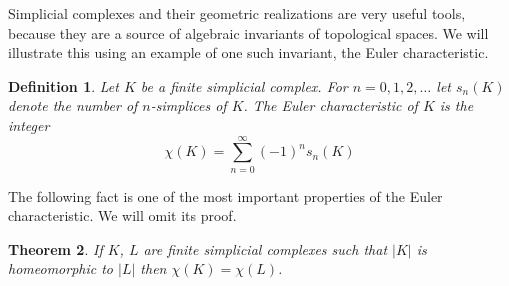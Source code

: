 \documentclass[11pt, letterpaper, oneside]{report}
\theoremstyle{pplain}
\newtheorem{theorem}{Theorem}[chapter]
\newtheorem{ITERMVALUE THM}[theorem]{Intermediate Value Theorem}
\newtheorem{HEINEBOREL THM}[theorem]{Heine-Borel Theorem}
\newtheorem{UMETR THM}[theorem]{Urysohn Metrization Theorem}
\newtheorem{UMETR2 THM}[theorem]{Urysohn Metrization Theorem (v.2)}
\theoremstyle{ddefinition}
\newtheorem{definition}[theorem]{Definition}
\theoremstyle{nnn}
\newtheorem{TDA NN}[theorem]{Topological Data Analysis. }
\theoremstyle{eexercise}
\begin{document}
Simplicial complexes and their geometric realizations are very useful tools, because they are a source of 
algebraic invariants of topological spaces. We will illustrate this using an example of one such invariant, 
the Euler characteristic.


\begin{definition}
Let $K$ be a finite simplicial complex. For $n=0, 1, 2, \dots$ let $s_{n}(K)$ denote the number of $n$-simplices
of $K$. The \emph{Euler characteristic} of $K$ is the integer 
$$\chi(K) = \sum_{n=0}^{\infty} (-1)^{n}s_{n}(K)$$ 
\end{definition}

The following fact is one of the most important properties of the Euler characteristic. We will omit its proof. 

\begin{theorem}
\label{SIMPLICIAL EULER CHAR INVARIANCE  THM}
If $K$, $L$ are finite simplicial complexes such that $|K|$ is homeomorphic to $|L|$ then $\chi(K) = \chi(L)$. 
\end{theorem}
\end{document}

